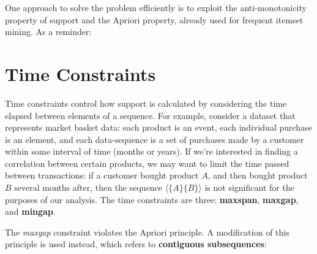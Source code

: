 One approach to solve the problem efficiently is to exploit the anti-monotonicity property of support and the Apriori property, already used for frequent itemset mining. As a reminder:


\section{Time Constraints}
\label{sec:tconstr}

Time constraints control how support is calculated by considering the time elapsed between elements of a sequence. For example, consider a dataset that represents market basket data: each product is an event, each individual purchase is an element, and each data-sequence is a set of purchases made by a customer within some interval of time (months or years). If we're interested in finding a correlation between certain products, we may want to limit the time passed between transactions: if a customer bought product $A$, and then bought product $B$ several months after, then the sequence $\langle \{A\} \{B\} \rangle$ is not significant for the purposes of our analysis. The time constraints are three: \textbf{maxspan}, \textbf{maxgap}, and \textbf{mingap}.


The \textit{maxgap} constraint violates the Apriori principle. A modification of this principle is used instead, which refers to \textbf{contiguous subsequences}: 

